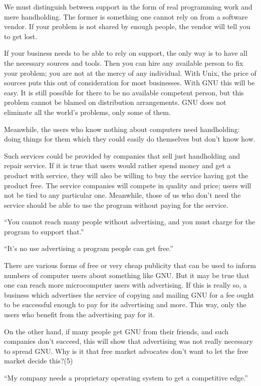 We must distinguish between support in the form of real programming work and mere handholding. The former is something one cannot rely on from a software vendor. If your problem is not shared by enough people, the vendor will tell you to get lost.

If your business needs to be able to rely on support, the only way is to have all the necessary sources and tools. Then you can hire any available person to fix your problem; you are not at the mercy of any individual. With Unix, the price of sources puts this out of consideration for most businesses. With GNU this will be easy. It is still possible for there to be no available competent person, but this problem cannot be blamed on distribution arrangements. GNU does not eliminate all the world's problems, only some of them.

Meanwhile, the users who know nothing about computers need handholding: doing things for them which they could easily do themselves but don't know how.

Such services could be provided by companies that sell just handholding and repair service. If it is true that users would rather spend money and get a product with service, they will also be willing to buy the service having got the product free. The service companies will compete in quality and price; users will not be tied to any particular one. Meanwhile, those of us who don't need the service should be able to use the program without paying for the service.

“You cannot reach many people without advertising, and you must charge for the program to support that.”

“It's no use advertising a program people can get free.”

There are various forms of free or very cheap publicity that can be used to inform numbers of computer users about something like GNU. But it may be true that one can reach more microcomputer users with advertising. If this is really so, a business which advertises the service of copying and mailing GNU for a fee ought to be successful enough to pay for its advertising and more. This way, only the users who benefit from the advertising pay for it.

On the other hand, if many people get GNU from their friends, and such companies don't succeed, this will show that advertising was not really necessary to spread GNU. Why is it that free market advocates don't want to let the free market decide this?(5)

“My company needs a proprietary operating system to get a competitive edge.”

